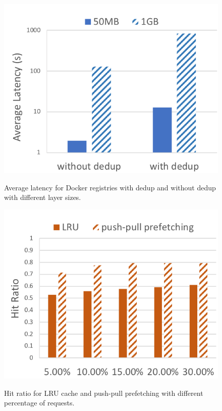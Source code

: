 \begin{figure}[t]
	\centering
	\begin{minipage}{0.225\textwidth}
		\centering
		\includegraphics[width=1\textwidth]{graphs/avglatency_dedup_nodedup.png}
		\caption{Average latency for Docker registries with dedup and without dedup with different layer sizes.}
		\label{fig:avg_latency_dedup_nodedup}
	\end{minipage}
	\begin{minipage}{0.225\textwidth}
		\centering
		\includegraphics[width=1\textwidth]{graphs/lru_prefetch_hits.png}
		\caption{Hit ratio for LRU cache and push-pull prefetching with different percentage of requests.}
		\vspace{-3pt}
		\label{fig:lru_prefetching_hits}
	\end{minipage}
\end{figure}